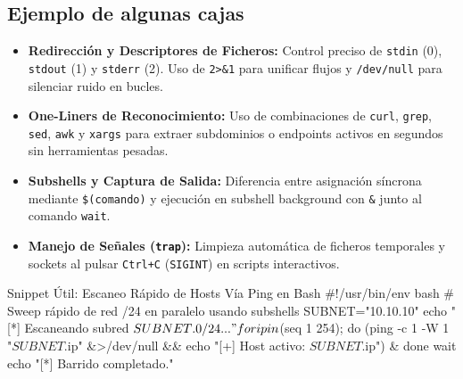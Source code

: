\subsection{Ejemplo de algunas cajas}

\begin{learningbox}
	\begin{itemize}[leftmargin=*]
		\item \textbf{Redirección y Descriptores de Ficheros:} Control preciso de \texttt{stdin} (0), \texttt{stdout} (1) y \texttt{stderr} (2). Uso de \texttt{2>\&1} para unificar flujos y \texttt{/dev/null} para silenciar ruido en bucles.
		\item \textbf{One-Liners de Reconocimiento:} Uso de combinaciones de \texttt{curl}, \texttt{grep}, \texttt{sed}, \texttt{awk} y \texttt{xargs} para extraer subdominios o endpoints activos en segundos sin herramientas pesadas.
		\item \textbf{Subshells y Captura de Salida:} Diferencia entre asignación síncrona mediante \texttt{\$(comando)} y ejecución en subshell background con \texttt{\&} junto al comando \texttt{wait}.
		\item \textbf{Manejo de Señales (\texttt{trap}):} Limpieza automática de ficheros temporales y sockets al pulsar \texttt{Ctrl+C} (\texttt{SIGINT}) en scripts interactivos.
	\end{itemize}
\end{learningbox}

\begin{sourcebox}
	\begin{itemize}[leftmargin=*]
	\end{itemize}
\end{sourcebox}


\begin{bashbox}{Snippet Útil: Escaneo Rápido de Hosts Vía Ping en Bash}
	#!/usr/bin/env bash
	# Sweep rápido de red /24 en paralelo usando subshells
	SUBNET="10.10.10"
	echo "[*] Escaneando subred ${SUBNET}.0/24..."

		for ip in $(seq 1 254); do
	(ping -c 1 -W 1 "${SUBNET}.${ip}" &>/dev/null && echo "[+] Host activo: ${SUBNET}.${ip}") &
	done
	wait
	echo "[*] Barrido completado."
\end{bashbox}
